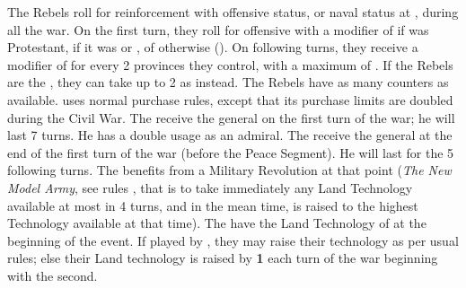 \phadm
\aparag[Reinforcements]
\bparag The Rebels roll for reinforcement with offensive status, or naval
status at , during all the war. On the first turn, they roll for
offensive with a modifier of  if \ENG was Protestant,  if
it was \CATHCR or \PROTANG, of  otherwise (\CATHCO).
\bparag On following turns, they receive a modifier of  for every 2
provinces they control, with a maximum of .
\bparag If the Rebels are the \parl, they can take up to 2 \LD as \ND instead.
\bparag The Rebels have as many counters as \ENG available.
\aparag \ENG uses normal purchase rules, except that its purchase limits are
doubled during the Civil War.
\aparag The \royal receive the general  on the first
turn of the war; he will last 7 turns. He has a double usage as an admiral.
\aparag The \parl receive the general  at the end of
the first turn of the war (before the Peace Segment).  He will last for the 5
following turns. The \parl benefits from a Military Revolution at that point
(\textit{The New Model Army}, see rules , that is to take immediately any Land Technology available at
most in 4 turns, and in the mean time, is raised to the highest Technology
available at that time).
\aparag The \royal have the Land Technology of \ENG at the beginning of the
event. If played by \ENG, they may raise their technology as per usual rules;
else their Land technology is raised by {\bf 1} each turn of the war beginning
with the second.

